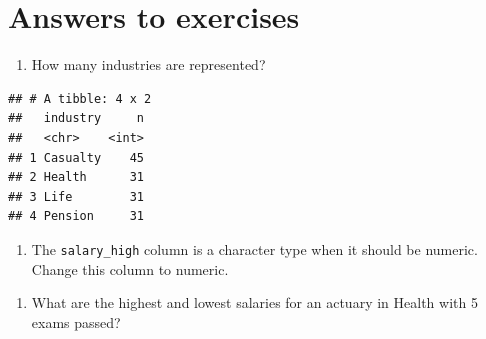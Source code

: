 \documentclass[]{book}
\newenvironment{Shaded}{\begin{snugshade}}{\end{snugshade}}
\newcommand{\CommentTok}[1]{\textcolor[rgb]{0.56,0.35,0.01}{\textit{#1}}}
\newcommand{\DataTypeTok}[1]{\textcolor[rgb]{0.13,0.29,0.53}{#1}}
\newcommand{\KeywordTok}[1]{\textcolor[rgb]{0.13,0.29,0.53}{\textbf{#1}}}
\newcommand{\NormalTok}[1]{#1}
\newcommand{\OperatorTok}[1]{\textcolor[rgb]{0.81,0.36,0.00}{\textbf{#1}}}
\newcommand{\StringTok}[1]{\textcolor[rgb]{0.31,0.60,0.02}{#1}}
\providecommand{\tightlist}{%
  \setlength{\itemsep}{0pt}\setlength{\parskip}{0pt}}
\begin{document}
\hypertarget{answers-to-exercises}{%
\section{Answers to exercises}\label{answers-to-exercises}}

\begin{enumerate}
\def\labelenumi{\arabic{enumi}.}
\tightlist
\item
  How many industries are represented?
\end{enumerate}

\begin{Shaded}
\end{Shaded}

\begin{verbatim}
## # A tibble: 4 x 2
##   industry     n
##   <chr>    <int>
## 1 Casualty    45
## 2 Health      31
## 3 Life        31
## 4 Pension     31
\end{verbatim}

\begin{enumerate}
\def\labelenumi{\arabic{enumi}.}
\setcounter{enumi}{1}
\tightlist
\item
  The \texttt{salary\_high} column is a character type when it should be numeric. Change this column to numeric.
\end{enumerate}

\begin{Shaded}
\end{Shaded}

\begin{enumerate}
\def\labelenumi{\arabic{enumi}.}
\setcounter{enumi}{2}
\tightlist
\item
  What are the highest and lowest salaries for an actuary in Health with 5 exams passed?
\end{enumerate}
\end{document}
